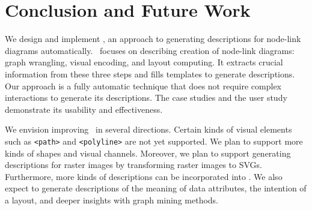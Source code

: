 \section{Conclusion and Future Work}
We design and implement \ApproachName, an approach to generating descriptions for node-link diagrams automatically.
\ApproachName~focuses on describing creation of node-link diagrams: graph wrangling, visual encoding, and layout computing.
It extracts crucial information from these three steps and fills templates to generate descriptions.
Our approach is a fully automatic technique that does not require complex interactions to generate its descriptions.
The case studies and the user study demonstrate its usability and effectiveness.

We envision improving \ApproachName~in several directions.
Certain kinds of visual elements such as \texttt{<path>} and \texttt{<polyline>} are not yet supported.
We plan to support more kinds of shapes and visual channels.
Moreover, we plan to support generating descriptions for raster images by transforming raster images to SVGs.
Furthermore, more kinds of descriptions can be incorporated into \ApproachName.
We also expect to generate descriptions of the meaning of data attributes, the intention of a layout, and deeper insights with graph mining methods.